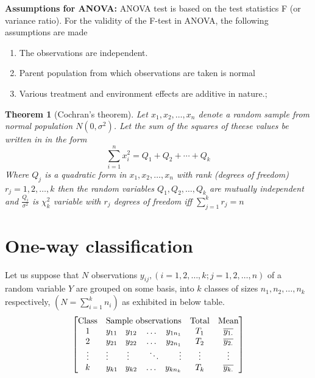 \documentclass[oneside,11pt,pdftex]{book}%
\numberwithin{equation}{section}
\newtheorem{theorem}{Theorem}[chapter]%
\numberwithin{section}{chapter}
\numberwithin{equation}{chapter}
\begin{document}
\textbf{Assumptions for ANOVA:} ANOVA test is based on the test statistics F (or variance ratio). For the validity of the F-test in ANOVA, the following assumptions are made
\begin{enumerate}
	\item The observations are independent.
	\item Parent population from which observations are taken is normal
	\item Various treatment and environment effects are additive in nature.;
\end{enumerate}

\begin{theorem}[Cochran's theorem]
	Let $ x_1, x_2, \dots, x_n $ denote a random sample from normal population $ N(0, \sigma^2) $. Let the sum of the squares of theese values be written in in the form \[ \sum_{i=1}^n x_i^2 = Q_1+Q_2+\cdots+Q_k \]
	Where $ Q_j $ is a quadratic form in $ x_1, x_2, \dots, x_n$ with rank (degrees of freedom) $ r_j=1,2,\dots,k $ then the random variables $ Q_1, Q_2, \dots, Q_k $ are mutually independent and $ \frac{Q_i}{\sigma^2} $ is $ \chi^2_k $ variable with $ r_j $ degrees of freedom iff $ \sum_{j=1}^k r_j=n $
\end{theorem}

\section{One-way classification}
Let us suppose that $ N $ observations $ y_{ij}, (i=1,2,\dots, k; j=1,2,\dots, n)$ of a random variable $ Y $ are grouped on some basis, into $ k $ classes of sizes $ n_1, n_2, \dots, n_k $ respectively, $ \left(N=\sum_{i=1}^{k} n_i \right) $ as exhibited in below table.
\[
\begin{bmatrix} 
	\text{Class} & \text{Sample observations} & \text{Total} & \text{Mean} \\
	1 & y_{11} \hfill y_{12} \hfill \dots \hfill y_{1n_1} & T_1 & \overline{y_{1.}}\\
	2 & y_{21} \hfill y_{22} \hfill \dots \hfill y_{2n_1} & T_2 & \overline{y_{2.}}\\
	\vdots & \vdots \hfill \vdots \hfill \ddots \hfill \vdots & \vdots & \vdots \\
	k & y_{k1} \hfill y_{k2} \hfill \dots \hfill y_{kn_{k}} & T_k & \overline{y_{k.}}
\end{bmatrix}
\]
\end{document}
